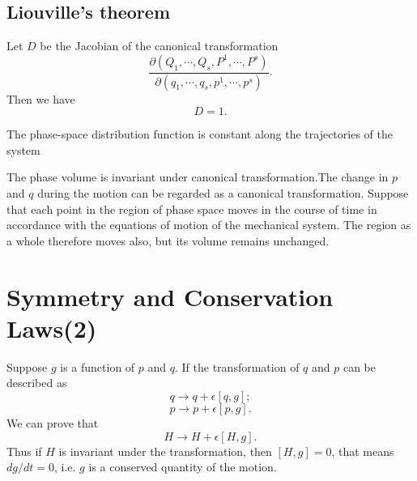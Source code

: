 \subsection{Liouville's theorem}
\begin{newlemma}
Let $D$ be the Jacobian of the canonical transformation 
\[\frac{\partial(Q_1,\cdots,Q_s,P^1,\cdots,P^s)}{\partial(q_1,\cdots,q_s,p^1,\cdots,p^s)}.\]
Then we have
\[D=1.\]
\end{newlemma}

\begin{newthem}
The phase-space distribution function is constant along the trajectories of the system
\end{newthem}

\begin{newproof}
The phase volume is invariant under canonical transformation.The change in $p$ and $q$ during the motion can be regarded as a canonical transformation. Suppose that each point in the region of phase space moves in the course of time in accordance with the equations of motion of the mechanical system. The region as a whole therefore moves also, but its volume remains unchanged.
\end{newproof}

\section{Symmetry and Conservation Laws(2)}
Suppose $g$ is a function of $p$ and $q$. If the transformation of $q$ and $p$ can be described as
\[q \rightarrow q + \epsilon [q,g];\]
\[p \rightarrow p + \epsilon [p,g].\]
We can prove that 
\[H \rightarrow H + \epsilon[H,g].\]
Thus if $H$ is invariant under the transformation, then $[H,g] = 0$, that means $dg/dt = 0$, i.e. $g$ is a conserved quantity of the motion.

